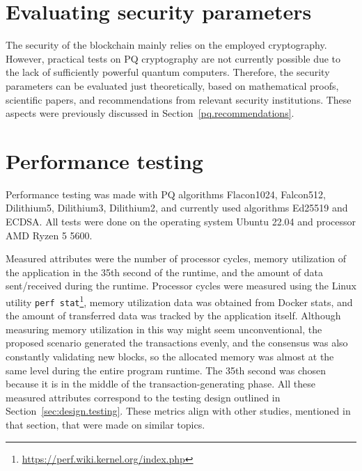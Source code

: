 
\section{Evaluating security parameters}

The security of the blockchain mainly relies on the employed cryptography. However, practical tests on PQ cryptography are not currently possible due to the lack of sufficiently powerful quantum computers. Therefore, the security parameters can be evaluated just theoretically, based on mathematical proofs, scientific papers, and recommendations from relevant security institutions. These aspects were previously discussed in Section~\ref{pq.recommendations}.



\section{Performance testing}

Performance testing was made with PQ algorithms Flacon1024, Falcon512, Dilithium5, Dilithium3, Dilithium2, and currently used algorithms Ed25519 and ECDSA. All tests were done on the operating system Ubuntu 22.04 and processor AMD Ryzen 5 5600. 

Measured attributes were the number of processor cycles, memory utilization of the application in the 35th second of the runtime, and the amount of data sent/received during the runtime. Processor cycles were measured using the Linux utility \texttt{perf stat}\footnote{\url{https://perf.wiki.kernel.org/index.php}}, memory utilization data was obtained from Docker stats, and the amount of transferred data was tracked by the application itself. Although measuring memory utilization in this way might seem unconventional, the proposed scenario generated the transactions evenly, and the consensus was also constantly validating new blocks, so the allocated memory was almost at the same level during the entire program runtime. The 35th second was chosen because it is in the middle of the transaction-generating phase. All these measured attributes correspond to the testing design outlined in Section~\ref{sec:design.testing}. These metrics align with other studies, mentioned in that section, that were made on similar topics.

